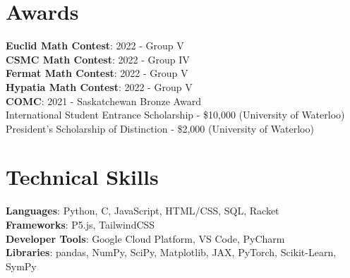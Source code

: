 \documentclass[letterpaper,11pt]{article}
\begin{document}
\section{Awards}
\begin{itemize}[leftmargin=0.15in, label={}]
    \small{\item{
    \textbf{Euclid Math Contest}{: 2022 - Group V} \\
    \textbf{CSMC Math Contest}{: 2022 - Group IV} \\
    \textbf{Fermat Math Contest}{: 2022 - Group V} \\
    \textbf{Hypatia Math Contest}{: 2022 - Group V} \\
    \textbf{COMC}{: 2021 - Saskatchewan Bronze Award} \\
    {International Student Entrance Scholarship - \$10,000 (University of Waterloo)} \\
    {President's Scholarship of Distinction - \$2,000 (University of Waterloo)}
    }}
\end{itemize}



%
\section{Technical Skills}
\begin{itemize}[leftmargin=0.15in, label={}]
    \small{\item{
    \textbf{Languages}{: Python, C, JavaScript, HTML/CSS, SQL, Racket} \\
    \textbf{Frameworks}{: P5.js, TailwindCSS} \\
    \textbf{Developer Tools}{: Google Cloud Platform, VS Code, PyCharm} \\
    \textbf{Libraries}{: pandas, NumPy, SciPy, Matplotlib, JAX, PyTorch, Scikit-Learn, SymPy}
    }}
\end{itemize}



\end{document}
